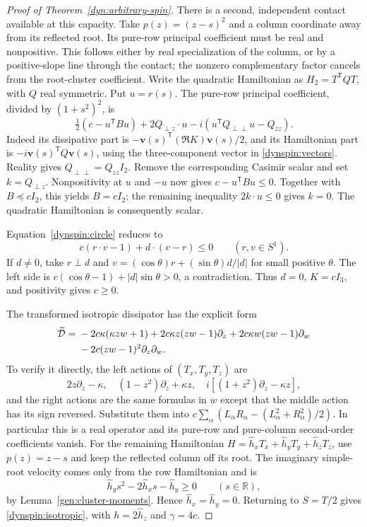 \documentclass[reqno]{amsart}
\theoremstyle{definition}
\theoremstyle{remark}
\newcommand{\R}{\mathbb R}
\begin{document}
\begin{proof}[Proof of Theorem~\ref{dyn:arbitrary-spin}]
There is a second, independent contact available at this capacity.
Take $p(z)=(z-s)^2$ and a column coordinate away from its reflected
root.  Its pure-row principal coefficient must be real and nonpositive.
This follows either by real specialization of the column, or by a
positive-slope line through the contact; the nonzero complementary
factor cancels from the root-cluster coefficient.
Write the quadratic Hamiltonian as $H_2=T^{\mathsf T}QT$, with $Q$
real symmetric.  Put $u=r(s)$.  The pure-row principal coefficient,
divided by $(1+s^2)^2$, is
\begin{equation}\label{dynspin:row-quadratic}
 \tfrac12(c-u^{\mathsf T}Bu)+2Q_{\perp z}\cdot u
       -i(u^{\mathsf T}Q_{\perp\perp}u-Q_{zz}).
\end{equation}
Indeed its dissipative part is
$-\mathbf v(s)^{\mathsf T}(\Re K)\mathbf v(s)/2$, and its Hamiltonian part is
$-i\mathbf v(s)^{\mathsf T}Q\mathbf v(s)$, using the three-component vector in
\eqref{dynspin:vectors}.  Reality gives
$Q_{\perp\perp}=Q_{zz}I_2$.  Remove the corresponding Casimir scalar
and set $k=Q_{\perp z}$.  Nonpositivity at $u$ and $-u$ now gives
$c-u^{\mathsf T}Bu\leq0$.  Together with $B\preceq cI_2$, this yields
$B=cI_2$; the remaining inequality $2k\cdot u\leq0$ gives $k=0$.
The quadratic Hamiltonian is consequently scalar.

Equation~\eqref{dynspin:circle} reduces to
\[
 c(r\cdot v-1)+d\cdot(v-r)\leq0\qquad(r,v\in S^1).
\]
If $d\ne0$, take $r\perp d$ and
$v=(\cos\theta)r+(\sin\theta)d/|d|$ for small positive $\theta$.
The left side is $c(\cos\theta-1)+|d|\sin\theta>0$, a contradiction.
Thus $d=0$, $K=cI_3$, and positivity gives $c\geq0$.

The transformed isotropic dissipator has the explicit form
\begin{align}\label{dynspin:cayley-diffusion}
 \widetilde{\mathcal D}={}&-2c\kappa(\kappa zw+1)
 +2c\kappa z(zw-1)\partial_z
 +2c\kappa w(zw-1)\partial_w\notag\\
 &-2c(zw-1)^2\partial_z\partial_w.
\end{align}
To verify it directly, the left actions of $(T_x,T_y,T_z)$ are
\[
 2z\partial_z-\kappa,\quad
 (1-z^2)\partial_z+\kappa z,\quad
 i[(1+z^2)\partial_z-\kappa z],
\]
and the right actions are the same formulas in $w$ except that the
middle action has its sign reversed.  Substitute them into
$c\sum_\alpha(L_\alpha R_\alpha
 -(L_\alpha^2+R_\alpha^2)/2)$.
In particular this is a real operator and its pure-row and pure-column
second-order coefficients vanish.
For the remaining Hamiltonian $H=\widehat h_xT_x+\widehat h_yT_y+
\widehat h_zT_z$, use $p(z)=z-s$ and keep the reflected column off its
root.  The imaginary simple-root velocity comes only from the row
Hamiltonian and is
\[
 \widehat h_y s^2-2\widehat h_xs-\widehat h_y\geq0\qquad(s\in\R),
\]
by Lemma~\ref{gen:cluster-moments}.  Hence
$\widehat h_x=\widehat h_y=0$.  Returning to $S=T/2$ gives
\eqref{dynspin:isotropic}, with $h=2\widehat h_z$ and $\gamma=4c$.


\end{proof}
\end{document}
